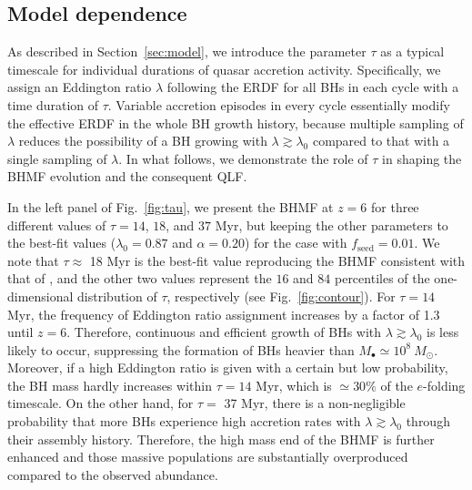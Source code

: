 \documentclass[twocolumn, twocolappendix]{aastex63}
\newcommand{\Msun}{M_\odot}
\newcommand{\tlife}{\tau}
\newcommand{\fseed}{f_\mathrm{seed}}
\begin{document}
\begin{CJK*}{UTF8}{gbsn}
\section{Model dependence}\label{sec:modep}
As described in Section~\ref{sec:model}, we introduce the parameter $\tau$ as a typical timescale
for individual durations of quasar accretion activity.
Specifically, we assign an Eddington ratio $\lambda$ following the ERDF for all BHs in each cycle
with a time duration of $\tau$.
Variable accretion episodes in every cycle essentially modify the effective ERDF in the whole BH growth history,
because multiple sampling of $\lambda$ reduces the possibility of a BH growing with $\lambda \gtrsim \lambda_0$
compared to that with a single sampling of $\lambda$.
In what follows, we demonstrate the role of $\tlife$ in shaping the BHMF evolution and the consequent QLF.

In the left panel of Fig.~\ref{fig:tau}, we present the BHMF at $z=6$ for three different values of $\tlife=14$, $18$, and $37$ Myr,
but keeping the other parameters to the best-fit values ($\lambda_0=0.87$ and $\alpha=0.20$) for the case with $\fseed=0.01$.
We note that $\tlife \approx$ 18 Myr is the best-fit value reproducing the BHMF consistent with that of ,
and the other two values represent the $16$ and $84$ percentiles of the one-dimensional distribution of $\tau$, respectively (see Fig.~\ref{fig:contour}).
For $\tlife=14$ Myr, the frequency of Eddington ratio assignment increases by a factor of 1.3 until $z=6$.
Therefore, continuous and efficient growth of BHs with $\lambda \gtrsim \lambda_0$ is less likely to occur,
suppressing the formation of BHs heavier than $M_\bullet \simeq 10^8~\Msun$.
Moreover, if a high Eddington ratio is given with a certain but low probability, the BH mass hardly increases
within $\tlife=14$ Myr, which is $\simeq 30\%$ of the $e$-folding timescale.
On the other hand, for $\tlife=$ 37 Myr, there is a non-negligible probability that
more BHs experience high accretion rates with $\lambda\gtrsim \lambda_0$ through their assembly history.
Therefore, the high mass end of the BHMF is further enhanced and those massive populations are substantially
overproduced compared to the observed abundance.


\end{CJK*}
\end{document}
